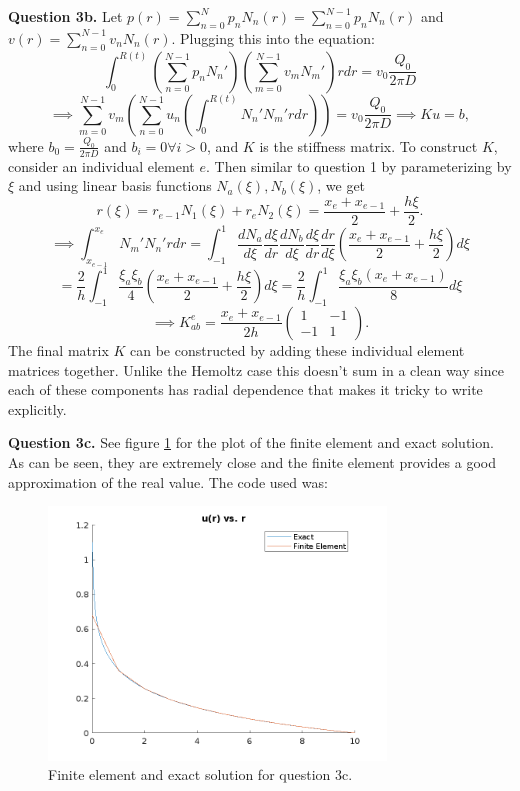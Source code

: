 \documentclass[letterpaper, reqno,11pt]{article}
\begin{document}
{\medskip\noindent\bf Question 3b.} Let $p(r)=\sum_{n=0}^{N}p_n N_n(r)=\sum_{n=0}^{N-1}p_n N_n(r)$ and $v(r)=\sum_{n=0}^{N-1}v_n N_n(r)$. Plugging this into the equation:
\[
\int_0^{R(t)}\left( \sum_{n=0}^{N-1}p_nN_n' \right) \left( \sum_{m=0}^{N-1}v_mN_m' \right) rdr=v_0 \frac{Q_0}{2\pi D}
\]
\[
  \implies \sum_{m=0}^{N-1}v_m\left( \sum_{n=0}^{N-1}u_n\left( \int_0^{R(t)}N_n'N_m'r dr \right)  \right)=v_0 \frac{Q_0}{2 \pi D} \implies Ku=b
,\]
where $b_0=\frac{Q_0}{2\pi D}$ and $b_i=0\forall i>0$, and $K$ is the stiffness matrix. To construct $K$, consider an individual element $e$. Then similar to question 1 by parameterizing by $\xi$ and using linear basis functions $N_a(\xi),N_b(\xi)$, we get
\[
r(\xi)=r_{e-1}N_1(\xi)+r_e N_2(\xi)= \frac{x_e+x_{e-1}}{2}+\frac{h\xi}{2}
.\]
\[
\implies \int_{x_{e-1}}^{x_e} N_m'N_n'rdr=\int_{-1}^{1}\frac{dN_a}{d\xi}\frac{d\xi}{dr}\frac{dN_b}{d\xi}\frac{d\xi}{dr}\frac{dr}{d\xi}\left( \frac{x_e+x_{e-1}}{2}+\frac{h\xi}{2} \right)  d\xi
\]
\[
=\frac{2}{h}\int_{-1}^{1}\frac{\xi_a\xi_b}{4}\left( \frac{x_e+x_{e-1}}{2}+\frac{h\xi}{2} \right)d\xi= \frac{2}{h}\int_{-1}^{1}\frac{\xi_a\xi_b\left( x_e+x_{e-1} \right) }{8}d\xi
\]
\[
  \implies K_{ab}^{e}=\frac{x_e+x_{e-1}}{2h}\begin{pmatrix} 1&-1\\-1&1 \end{pmatrix} 
.\]
The final matrix $K$ can be constructed by adding these individual element matrices together. Unlike the Hemoltz case this doesn't sum in a clean way since each of these components has radial dependence that makes it tricky to write explicitly.

{\medskip\noindent\bf Question 3c.} See figure \ref{fig:q3c} for the plot of the finite element and exact solution. As can be seen, they are extremely close and the finite element provides a good approximation of the real value. The code used was:

\begin{figure}[htpb]
  \centering
  \includegraphics[width=0.8\textwidth]{q3c}
  \caption{Finite element and exact solution for question 3c.}
  \label{fig:q3c}
\end{figure}
\end{document}
